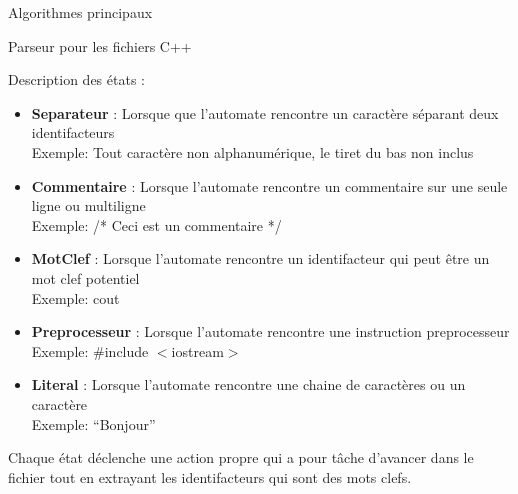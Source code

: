 \documentclass{article}
\begin{document}
\begin{section}{Algorithmes principaux}
\begin{subsection}{Parseur pour les fichiers C++}
  \begin{paragraph}{Description des états :}
   \begin{itemize}
    \item \textbf{Separateur} : Lorsque que l'automate rencontre un caractère séparant deux identifacteurs\\Exemple: Tout caractère non alphanumérique, le tiret du bas non inclus
    \item \textbf{Commentaire} : Lorsque l'automate rencontre un commentaire sur une seule ligne ou multiligne \\Exemple: /* Ceci est un commentaire */
    \item \textbf{MotClef} : Lorsque l'automate rencontre un identifacteur qui peut être un mot clef potentiel \\Exemple: cout
    \item \textbf{Preprocesseur} : Lorsque l'automate rencontre une instruction preprocesseur \\Exemple: \#include $<$iostream$>$
    \item \textbf{Literal} : Lorsque l'automate rencontre une chaine de caractères ou un caractère\\Exemple: ``Bonjour''\\
   \end{itemize}
  \end{paragraph}
  
  Chaque état déclenche une action propre qui a pour tâche d'avancer dans le fichier tout en extrayant les identifacteurs qui sont des mots clefs.
  \end{subsection}

\end{section}
\end{document}
